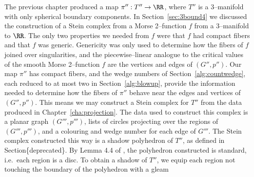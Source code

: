 The previous chapter produced a map $\pi'':T''\to \RR$, where $T''$ is a 3--manifold with only spherical boundary components.
In Section~\ref{sec:3bound4} we discussed the construction of a Stein complex from a Morse 2--function $f$ from a 3--manifold to $\RR$.
The only two properties we needed from $f$ were that $f$ had compact fibers and that $f$ was generic.
Genericity was only used to determine how the fibers of $f$ joined over singularities, and the piecewise--linear analogue to the critical values of the smooth Morse 2--function $f$ are the vertices and edges of $(G'',p'')$.
Our map $\pi''$ has compact fibers, and the wedge numbers of Section~\ref{alg:countwedge}, each reduced to at most two in Section~\ref{alg:blowup}, provide the information needed to determine how the fibers of $\pi''$ behave near the edges and vertices of $(G'',p'')$.
This means we may construct a Stein complex for $T''$ from the data produced in Chapter~\ref{cha:projection}.
The data used to construct this complex is a planar graph $(G''',p''')$, lists of circles projecting over the regions of $(G''',p''')$, and a colouring and wedge number for each edge of $G'''$.
The Stein complex constructed this way is a shadow polyhedron of $T''$, as defined in Section\{deprecated\}.
By Lemma 4.4 of \cite{CostThur08}, the polyhedron constructed is standard, i.e.\ each region is a disc.
To obtain a shadow of $T''$, we equip each region not touching the boundary of the polyhedron with a gleam
